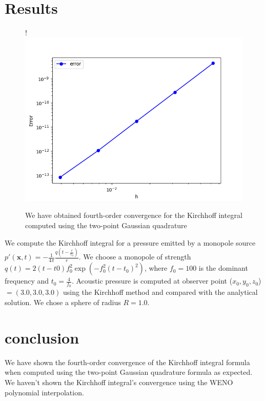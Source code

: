 \documentclass[a4paper]{article}
\begin{document}
\section*{Results}
\begin{figure}!
    \centering
    \includegraphics[scale=0.5]{images/convergence.png}
    \caption{We have obtained fourth-order convergence for the Kirchhoff integral computed using the two-point Gaussian quadrature}
\end{figure}
We compute the Kirchhoff integral for a pressure emitted by a monopole source 
$p'(\mathbf{x}, t) = -\frac{1}{4\pi} \frac{  q(t - \frac{r}{c_{0}}) }{r}$. We choose a monopole of strength $q(t) = 2(t - t0)f_{0}^{2}\exp( -f_{0}^2(t - t_{0})^{2})$, 
where $f_{0} = 100$ is the dominant frequency and $t_{0} = \frac{4}{f_{0}}$. Acoustic pressure is computed at observer point ($x_{0}, y_{0}, z_{0}$) $= (3.0, 3.0, 3.0)$ using the Kirchhoff method and compared with the analytical solution. We chose a sphere of radius $R = 1.0$. 
\section*{conclusion}
We have shown the fourth-order convergence of the Kirchhoff integral formula when computed using the two-point Gaussian quadrature formula as expected. We haven't shown the Kirchhoff integral's convergence using the WENO polynomial interpolation.
\end{document}
